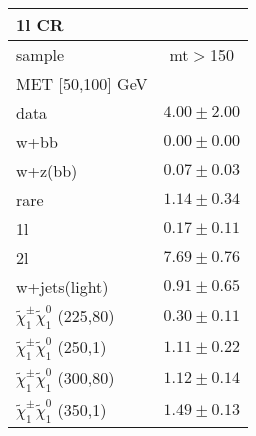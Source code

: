 \begin{table}
\begin{center}
\small
\begin{tabular}{lc}
\hline
1l CR & \\
\hline
sample&mt$>$150\\
\hline
MET [50,100] GeV &  \\
\hline
data&$4.00\pm2.00$\\
\hline
w+bb&$0.00\pm0.00$\\
w+z(bb)&$0.07\pm0.03$\\
rare&$1.14\pm0.34$\\
1l&$0.17\pm0.11$\\
2l&$7.69\pm0.76$\\
w+jets(light)&$0.91\pm0.65$\\
$\tilde{\chi}_{1}^{\pm}\tilde{\chi}_{1}^{0}$ (225,80)&$0.30\pm0.11$\\
$\tilde{\chi}_{1}^{\pm}\tilde{\chi}_{1}^{0}$ (250,1)&$1.11\pm0.22$\\
$\tilde{\chi}_{1}^{\pm}\tilde{\chi}_{1}^{0}$ (300,80)&$1.12\pm0.14$\\
$\tilde{\chi}_{1}^{\pm}\tilde{\chi}_{1}^{0}$ (350,1)&$1.49\pm0.13$\\
\hline
\hline\hline
\hline
\end{tabular}
\end{center}
\end{table}
